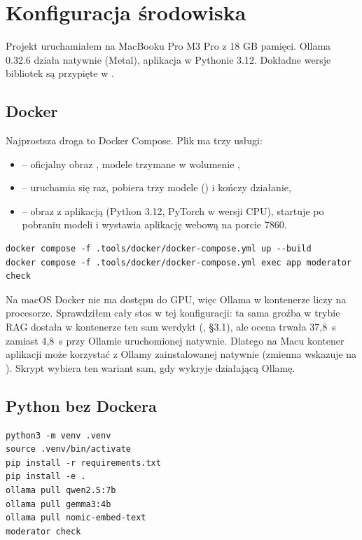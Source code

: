 \section{Konfiguracja środowiska}
\label{sec:srodowisko}

Projekt uruchamiałem na MacBooku Pro M3 Pro z 18 GB pamięci. Ollama 0.32.6 działa natywnie (Metal), aplikacja
w Pythonie 3.12. Dokładne wersje bibliotek są przypięte w .

\subsection{Docker}

Najprostsza droga to Docker Compose. Plik  ma trzy usługi:
\begin{itemize}
  \item {} -- oficjalny obraz , modele trzymane w wolumenie ,
  \item {} -- uruchamia się raz, pobiera trzy modele () i kończy działanie,
  \item {} -- obraz z aplikacją (Python 3.12, PyTorch w wersji CPU), startuje po pobraniu modeli i wystawia
        aplikację webową na porcie 7860.
\end{itemize}

\begin{verbatim}
docker compose -f .tools/docker/docker-compose.yml up --build
docker compose -f .tools/docker/docker-compose.yml exec app moderator check
\end{verbatim}

Na macOS Docker nie ma dostępu do GPU, więc Ollama w kontenerze liczy na procesorze. Sprawdziłem cały stos w tej
konfiguracji: ta sama groźba w trybie RAG dostała w kontenerze ten sam werdykt (, §3.1), ale ocena trwała
37,8~s zamiast 4,8~s przy Ollamie uruchomionej natywnie.
Dlatego na Macu kontener aplikacji może korzystać z Ollamy zainstalowanej natywnie (zmienna 
wskazuje na ). Skrypt  wybiera ten wariant sam, gdy wykryje działającą Ollamę.

\subsection{Python bez Dockera}

\begin{verbatim}
python3 -m venv .venv
source .venv/bin/activate
pip install -r requirements.txt
pip install -e .
ollama pull qwen2.5:7b
ollama pull gemma3:4b
ollama pull nomic-embed-text
moderator check
\end{verbatim}

